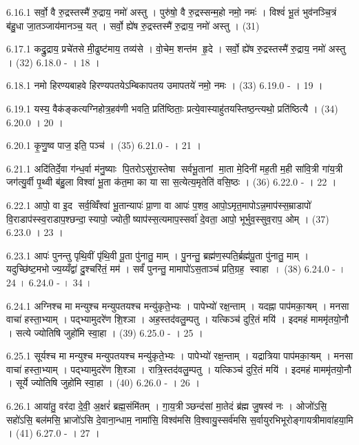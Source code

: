 6.16.1
सर्वो॒ वै रु॒द्रस्तस्मै॑ रु॒द्राय॒ नमो॑ अस्तु । पुरु॑षो॒ वै रु॒द्रस्सन्म॒हो नमो॒ नमः॑ । विश्वं॑ भू॒तं भुव॑नञ्चि॒त्रं ब॑हु॒धा जा॒तञ्जाय॑मानञ्च॒ यत् । सर्वो॒ ह्ये॑ष रु॒द्रस्तस्मै॑ रु॒द्राय॒ नमो॑ अस्तु । (31)
\anuvakamend

6.17.1
कद्रु॒द्राय॒ प्रचे॑तसे मी॒ढुष्ट॑माय॒ तव्य॑से । वो॒चेम॒ शन्त॑म हृ॒दे । सर्वो॒ ह्ये॑ष रु॒द्रस्तस्मै॑ रु॒द्राय॒ नमो॑ अस्तु । (32)
6.18.0
- । 18 ।
\anuvakamend

6.18.1
नमो हिरण्यबाहवे हिरण्यपतयेऽम्बिकापतय उमापतये॑ नमो॒ नमः । (33)
6.19.0
- । 19 ।
\anuvakamend

6.19.1
यस्य॒ वैक॑ङ्कत्यग्निहोत्र॒हव॑णी भवति॒ प्रति॑ष्ठिताः॒ प्रत्ये॒वास्याहु॑तयस्तिष्ठ॒न्त्यथो॒ प्रति॑ष्ठित्यै । (34)
6.20.0
। 20 ।
\anuvakamend

6.20.1
कृ॒णु॒ष्व पाज॒ इति॒ पञ्च॑ । (35)
6.21.0
- । 21 ।
\anuvakamend

6.21.1
अदि॑तिर्दे॒वा ग॑न्ध॒र्वा म॑नु॒ष्याः पि॒तरोऽसु॑रा॒स्तेषा सर्वभू॒तानां मा॒ता मे॒दिनी॑ मह॒ती म॒ही सा॑वि॒त्री गा॑य॒त्री जग॑त्यु॒र्वी पृ॒थ्वी ब॑हु॒ला विश्वा॑ भू॒ता क॑त॒मा का या सा स॒त्येत्य॒मृतेति॑ वसि॒ष्ठः । (36)
6.22.0
- । 22 ।
\anuvakamend

6.22.1
आपो॒ वा इ॒द सर्व॒व्विँश्वा॑ भू॒तान्यापः॑ प्रा॒णा वा आपः॑ प॒शव॒ आपो॒ऽमृत॒मापोऽन्न॒माप॑स्स॒म्राडापो॑ वि॒राडाप॑स्स्व॒राडाप॒श्छन्दा॒स्यापो॒ ज्योती॒ष्याप॑स्स॒त्यमाप॒स्सर्वा॑ दे॒वता॒ आपो॒ भूर्भुव॒स्सुव॒राप॒ ओम् । (37)
6.23.0
। 23 ।
\anuvakamend

6.23.1
आपः॑ पुनन्तु पृथि॒वीं पृ॑थि॒वी पू॒ता पु॑नातु॒ माम् । पु॒नन्तु॒ ब्रह्म॑ण॒स्पति॒र्ब्रह्म॑पू॒ता पु॑नातु॒ माम् । यदुच्छि॑ष्ट॒मभोज्य॒य्यँद्वा॑ दु॒श्चरि॑तं॒ मम॑ । सर्वं॑ पुनन्तु॒ मामापो॑ऽस॒ताञ्च॑ प्रति॒ग्रह॒ स्वाहा । (38)
6.24.0
- । 24 ।
6.24.0
- । 34 ।
\anuvakamend

6.24.1
अग्निश्च मा मन्युश्च मन्युपतयश्च मन्यु॑कृते॒भ्यः । पापेभ्यो॑ रक्ष॒न्ताम् । यदह्ना पाप॑मका॒ऱ्षम् । मनसा वाचा॑ हस्ता॒भ्याम् । पद्भ्यामुदरे॑ण शि॒श्ञा । अह॒स्तद॑वलु॒म्पतु । यत्किञ्च॑ दुरि॒तं मयि॑ । इदमहं माममृ॑तयो॒नौ । सत्ये ज्योतिषि जुहो॑मि स्वा॒हा । (39)
6.25.0
- । 25 ।
\anuvakamend

6.25.1
सूर्यश्च मा मन्युश्च मन्युपतयश्च मन्यु॑कृते॒भ्यः । पापेभ्यो॑ रक्ष॒न्ताम् । यद्रात्रिया पाप॑मका॒ऱ्षम् । मनसा वाचा॑ हस्ता॒भ्याम् । पद्भ्यामुदरे॑ण शि॒श्ञा । रात्रि॒स्तद॑वलु॒म्पतु । यत्किञ्च॑ दुरि॒तं मयि॑ । इदमहं माममृ॑तयो॒नौ । सूर्ये ज्योतिषि जुहो॑मि स्वा॒हा । (40)
6.26.0
- । 26 ।
\anuvakamend

6.26.1
आया॑तु॒ वर॑दा दे॒वी॒ अ॒क्षरं॑ ब्रह्म॒संमि॑तम् । गा॒य॒त्रीञ्छन्द॑सां मा॒तेदं ब्र॑ह्म जु॒षस्व॑ नः । ओजो॑ऽसि॒ सहो॑ऽसि॒ बल॑मसि॒ भ्राजो॑ऽसि दे॒वाना॒न्धाम॒ नामा॑सि॒ विश्व॑मसि वि॒श्वायु॒स्सर्व॑मसि स॒र्वायुरभिभूरोङ्गायत्रीमावा॑हया॒मि । (41)
6.27.0
- । 27 ।
\anuvakamend

